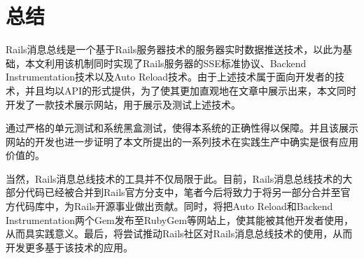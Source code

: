 \chapter{总结}

Rails消息总线是一个基于Rails服务器技术的服务器实时数据推送技术，以此为基础，本文利用该机制同时实现了Rails服务器的SSE标准协议、Backend Instrumentation技术以及Auto Reload技术。由于上述技术属于面向开发者的技术，并且均以API的形式提供，为了使其更加直观地在文章中展示出来，本文同时开发了一款技术展示网站，用于展示及测试上述技术。

通过严格的单元测试和系统黑盒测试，使得本系统的正确性得以保障。并且该展示网站的开发也进一步证明了本文所提出的一系列技术在实践生产中确实是很有应用价值的。

当然，Rails消息总线技术的工具并不仅局限于此。目前，Rails消息总线技术的大部分代码已经被合并到Rails官方分支中，笔者今后将致力于将另一部分合并至官方代码库中，为Rails开源事业做出贡献。同时，将把Auto Reload和Backend Instrumentation两个Gem发布至RubyGem等网站上，使其能被其他开发者使用，从而具实践意义。最后，将尝试推动Rails社区对Rails消息总线技术的使用，从而开发更多基于该技术的应用。